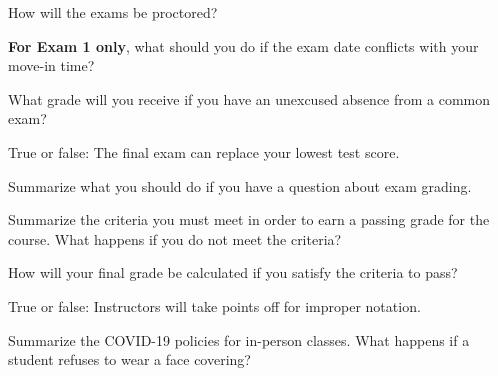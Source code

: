 \documentclass{exam}
\numberwithin{equation}{section} %
\numberwithin{figure}{section} %
\numberwithin{table}{section} %
\begin{document}
\begin{questions}
\newpage

\question How will the exams be proctored?
\begin{solution}[\stretch{1}]

\end{solution}

\question \textbf{For Exam 1 only}, what should you do if the exam date conflicts with your move-in time? 
\begin{solution}[\stretch{1}]

\end{solution}

\question What grade will you receive if you have an unexcused absence from a common exam?
\begin{solution}[\stretch{1}]

\end{solution}

\question True or false: The final exam can replace your lowest test score.
\begin{solution}[\stretch{1}]

\end{solution}

\question Summarize what you should do if you have a question about exam grading. 
\begin{solution}[\stretch{1}]

\end{solution}

\newpage

\question Summarize the criteria you must meet in order to earn a passing grade for the course. What happens if you do not meet the criteria?
\begin{solution}[\stretch{2}]

\end{solution}

\question How will your final grade be calculated if you satisfy the criteria to pass?
\begin{solution}[\stretch{1}]

\end{solution}

\question True or false: Instructors will take points off for improper notation.
\begin{solution}[\stretch{1}]

\end{solution}

\newpage

\question Summarize the COVID-19 policies for in-person classes. What happens if a student refuses to wear a face covering?
\begin{solution}[\stretch{2}]


\end{solution}
\end{questions}
\end{document}
